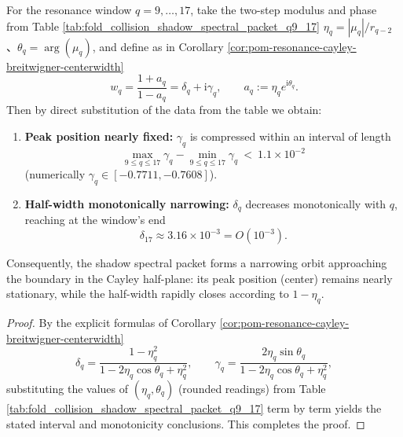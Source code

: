 \begin{corollary}\label{cor:pom-resonance-cayley-narrowing-orbit}
For the resonance window \(q=9,\dots,17\), take the two-step modulus and phase from Table \ref{tab:fold_collision_shadow_spectral_packet_q9_17}
\(
\eta_q=|\mu_q|/r_{q-2}
\)、\(\theta_q=\arg(\mu_q)
\), and define as in Corollary \ref{cor:pom-resonance-cayley-breitwigner-centerwidth}
\[
w_q=\frac{1+a_q}{1-a_q}=\delta_q+\mathrm{i}\gamma_q,
\qquad a_q:=\eta_q e^{\mathrm{i}\theta_q}.
\]
Then by direct substitution of the data from the table we obtain:
\begin{enumerate}
  \item \textbf{Peak position nearly fixed:} \(\gamma_q\) is compressed within an interval of length
  \[
  \max_{9\le q\le 17}\gamma_q-\min_{9\le q\le 17}\gamma_q\ <\ 1.1\times 10^{-2}
  \]
  (numerically \(\gamma_q\in[-0.7711,-0.7608]\)).
  \item \textbf{Half-width monotonically narrowing:} \(\delta_q\) decreases monotonically with \(q\), reaching at the window's end
  \[
  \delta_{17}\approx 3.16\times 10^{-3}=O(10^{-3}).
  \]
\end{enumerate}
Consequently, the shadow spectral packet forms a narrowing orbit approaching the boundary in the Cayley half-plane: its peak position (center) remains nearly stationary, while the half-width rapidly closes according to \(1-\eta_q\).
\end{corollary}
\begin{proof}
By the explicit formulas of Corollary \ref{cor:pom-resonance-cayley-breitwigner-centerwidth}
\[
\delta_q=\frac{1-\eta_q^{2}}{1-2\eta_q\cos\theta_q+\eta_q^{2}},
\qquad
\gamma_q=\frac{2\eta_q\sin\theta_q}{1-2\eta_q\cos\theta_q+\eta_q^{2}},
\]
substituting the values of \((\eta_q,\theta_q)\) (rounded readings) from Table \ref{tab:fold_collision_shadow_spectral_packet_q9_17} term by term yields the stated interval and monotonicity conclusions. This completes the proof.
\end{proof}
\endinput


